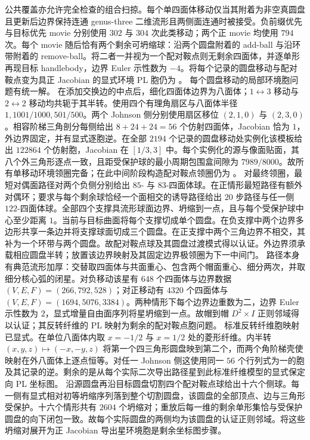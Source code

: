 公共覆盖亦允许完全检查的组合扫掠。每个单四面体移动仅当其附着为非空真圆盘且更新后边界保持连通 genus-three 二维流形且两侧面连通时被接受。负前缀优先与目标优先 movie 分别使用 $302$ 与 $304$ 次此类移动；两个正 movie 均使用 $794$ 次。每个 movie 随后恰有两个剩余可坍缩球：沿两个圆盘附着的 add-ball 与沿环带附着的 remove-ball。将二者一并视为一个配对鞍点则无剩余四面体，并逐单形再现目标 handlebody，边界 Euler 示性数为 $-4$。将每个记录的圆盘移动与配对鞍点变为具正 Jacobian 的显式环境 PL 胞仍为
\Open。
每个圆盘移动的局部环境胞问题有统一解。
在添加交换边的中点后，细化四面体边界为八面体；$1\leftrightarrow3$ 移动与
$2\leftrightarrow2$ 移动均共轭于其半转。使用四个有理角扇区与八面体半径 $1,1001/1000,501/500$。两个 Johnson 侧分别使用扇区移位 $(2,1,0)$ 与 $(2,3,0)$。相容阶梯三角剖分每侧给出 $8+24+24=56$ 个仿射四面体，Jacobian 恰为 $1$，外边界固定，并有显式逐胞逆。在全部 $2194$ 个记录的圆盘移动处实例化该模板给出 $122864$ 个仿射胞，Jacobian 在 $[1/3,3]$ 中。每个实例化的源与像面贴面，其八个外三角形逐点一致，且距受保护球的最小周期包围盒间隙为
$7989/8000$。故所有单移动环境领圈完备；在此中间阶段构造配对鞍点领圈仍为 \Open。
对最终领圈，最短对偶面路径对两个负侧分别给出 $85$- 与
$83$-四面体球。在正情形最短路径有额外对偶环；要求与每个剩余球恰经一个面相交的诱导路径给出 $20$ 步路径与任一侧 $122$-四面体球。全部四个支撑具流形球面边界、坍缩到一点，且与每个受保护球中心至少距离 $1$。当前与目标曲面将每个支撑切成单个圆盘。在负支撑中两个边界多边形共享一条边并将支撑球面切成三个圆盘。在正支撑中两个三角边界不相交，其补为一个环带与两个圆盘。故配对鞍点球及其圆盘过渡模式得以认证。外边界须承载相应圆盘半转；放置该边界映射及其固定边界极领圈为下一中间门。
路径本身有典范流形加厚：交替取四面体与共面重心、包含两个帽面重心、细分两次，并取细分核心弧的闭星。对负移动该星有 $648$ 个四面体与边界数据 $(V,E,F)=(266,792,528)$；对正移动有 $4320$ 个四面体与
$(V,E,F)=(1694,5076,3384)$。两种情形下每个边界边重数为二，边界 Euler 示性数为 $2$，显式增量自由面序列将星坍缩到一点。故帽到帽 $D^2\times I$ 正则邻域得以认证；其反转纤维的 PL 映射为剩余的配对鞍点胞问题。
标准反转纤维胞映射已显式。在单位八面体内取 $x=-1/2$ 与 $x=1/2$ 处的菱形纤维。内半转 $(x,y,z)\mapsto(-x,-y,z)$ 将第一个四三角形圆盘映到第二个，而两个角阶梯壳使映射在外八面体上逐点恒等。对任一 Johnson 侧这使用同一 $56$ 个行列式为一的胞及其记录的逆。剩余的是从每个实际二次导出路径星到此标准纤维模型的显式保定向 PL 坐标图。
沿源圆盘再沿目标圆盘切割四个配对鞍点球给出十六个侧球。每一侧有显式相对初等坍缩序列落到整个切割圆盘，该圆盘的全部顶点、边与三角形受保护。十六个情形共有 $2604$ 个坍缩对；重放后每一维的剩余单形集恰与受保护圆盘的向下闭包一致。故每个实际圆盘的两侧均为该圆盘的认证正则邻域。将这些坍缩对展开为正 Jacobian 导出星环境胞是剩余坐标图步骤。
